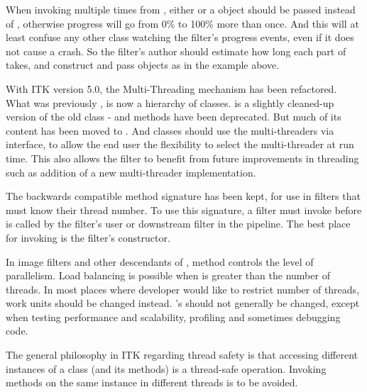 When invoking  multiple times from
, either  or a
 object should be passed instead of ,
otherwise progress will go from 0\% to 100\% more than once. And this
will at least confuse any other class watching the filter's progress events,
even if it does not cause a crash. So the filter's author should estimate
how long each part of  takes, and construct and pass
 objects as in the example above.

With ITK version 5.0, the Multi-Threading mechanism has been refactored.
What was previously , is now a hierarchy of classes.
 is a slightly cleaned-up version of the old
class -  and  methods have been
deprecated. But much of its content has been moved to
. And classes should use the multi-threaders via
 interface, to allow the end user the flexibility to
select the multi-threader at run time. This also allows the filter to
benefit from future improvements in threading such as addition of a new
multi-threader implementation.

The backwards compatible  method
signature has been kept, for use in filters that must know their thread number.
To use this signature, a filter must invoke
 before  is called by
the filter's user or downstream filter in the pipeline. The best place for
invoking  is the filter's constructor.

In image filters and other descendants of , method
 controls the level of parallelism.
Load balancing is possible when  is greater
than the number of threads. In most places where developer would like to
restrict number of threads, work units should be changed instead.
's  should not
generally be changed, except when testing performance and scalability,
profiling and sometimes debugging code.

The general philosophy in ITK regarding thread safety is that accessing
different instances of a class (and its methods) is a thread-safe operation.
Invoking methods on the same instance in different threads is to be avoided.



